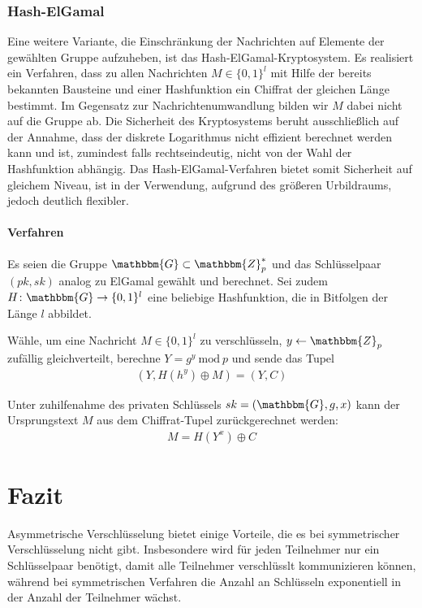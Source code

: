 \subsubsection{Hash-ElGamal} Eine weitere Variante, die Einschränkung
der Nachrichten auf Elemente der gewählten Gruppe aufzuheben, ist das
Hash-ElGamal-Kryptosystem\indexHashElGamal. Es realisiert ein Verfahren, dass zu allen
Nachrichten $M \in \{0, 1\}^l$ mit Hilfe der bereits bekannten Bausteine
und einer Hashfunktion ein Chiffrat der gleichen Länge bestimmt. Im
Gegensatz zur Nachrichtenumwandlung bilden wir $M$ dabei nicht auf die
Gruppe ab. Die Sicherheit des Kryptosystems beruht ausschließlich auf
der Annahme, dass der diskrete Logarithmus nicht effizient berechnet
werden kann und ist, zumindest falls rechtseindeutig, nicht von der Wahl
der Hashfunktion abhängig. Das Hash-ElGamal-Verfahren bietet somit
Sicherheit auf gleichem Niveau, ist in der Verwendung, aufgrund des
größeren Urbildraums, jedoch deutlich flexibler.

\paragraph*{Verfahren} Es seien die Gruppe $\mathbbm{G} \subset
\mathbbm{Z}^*_p$ und das Schlüsselpaar $(pk,sk)$ analog zu ElGamal
gewählt und berechnet. Sei zudem $H \colon \mathbbm{G} \rightarrow
\{0,1\}^l$ eine beliebige Hashfunktion, die in Bitfolgen der Länge $l$
abbildet.

Wähle, um eine Nachricht $M \in \{0,1\}^l$ zu verschlüsseln, $y
\leftarrow \mathbbm{Z}_p$ zufällig gleichverteilt, berechne $Y = g^y\
\text{mod}\ p$ und sende das Tupel
\begin{align*} (Y, H(h^y) \oplus M) = (Y, C)
\end{align*}

Unter zuhilfenahme des privaten Schlüssels $sk = (\mathbbm{G}, g, x)$
kann der Ursprungstext $M$ aus dem Chiffrat-Tupel zurückgerechnet
werden:
\begin{align*} M = H(Y^x) \oplus C
\end{align*}

\section{Fazit}
Asymmetrische Verschlüsselung \indexEncryptionAsymm bietet einige Vorteile, die es bei
symmetrischer Verschlüsselung nicht gibt. Insbesondere wird für jeden
Teilnehmer nur ein Schlüsselpaar benötigt, damit alle Teilnehmer
verschlüsslt kommunizieren können, während bei symmetrischen Verfahren
die Anzahl an Schlüsseln exponentiell in der Anzahl der Teilnehmer
wächst.

